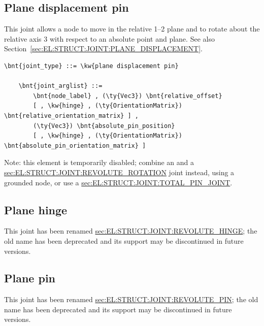 \subsection{Plane displacement pin}
This joint allows a node to move in the relative 1--2 plane 
and to rotate about the relative axis 3 with respect to an absolute point 
and plane.
See also Section~\ref{sec:EL:STRUCT:JOINT:PLANE_DISPLACEMENT}.
\begin{Verbatim}[commandchars=\\\{\}]
    \bnt{joint_type} ::= \kw{plane displacement pin}

    \bnt{joint_arglist} ::= 
        \bnt{node_label} , (\ty{Vec3}) \bnt{relative_offset}
        [ , \kw{hinge} , (\ty{OrientationMatrix}) \bnt{relative_orientation_matrix} ] ,
        (\ty{Vec3}) \bnt{absolute_pin_position}
        [ , \kw{hinge} , (\ty{OrientationMatrix}) \bnt{absolute_pin_orientation_matrix} ]
\end{Verbatim}
Note: this element is temporarily disabled;
combine an  and a
\hyperref{\kw{revolute rotation}}{\kw{revolute rotation} (see Section~}{)}{sec:EL:STRUCT:JOINT:REVOLUTE_ROTATION}
joint instead, using a grounded node, or use a
\hyperref{\kw{total pin joint}}{\kw{total pin joint}, see Section~}{}{sec:EL:STRUCT:JOINT:TOTAL_PIN_JOINT}.


\subsection{Plane hinge}
This joint has been renamed
\hyperref{\kw{revolute hinge}}{\kw{revolute hinge} (see Section~}{)}{sec:EL:STRUCT:JOINT:REVOLUTE_HINGE};
the old name has been deprecated and its support may be discontinued
in future versions.

\subsection{Plane pin}
This joint has been renamed
\hyperref{\kw{revolute pin}}{\kw{revolute pin} (see Section~}{)}{sec:EL:STRUCT:JOINT:REVOLUTE_PIN};
the old name has been deprecated and its support may be discontinued
in future versions.

